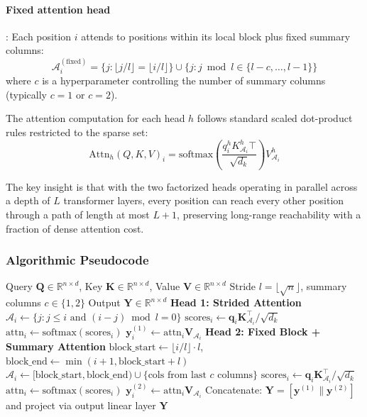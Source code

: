 \paragraph{Fixed attention head}: Each position $i$ attends to positions within its local block plus fixed summary columns:
\[
\mathcal{A}_i^{(\text{fixed})} = \{j : \lfloor j/l \rfloor = \lfloor i/l \rfloor\} \cup \{j : j \bmod l \in \{l-c, \ldots, l-1\}\}
\]
where $c$ is a hyperparameter controlling the number of summary columns (typically $c=1$ or $c=2$).

The attention computation for each head $h$ follows standard scaled dot-product rules restricted to the sparse set:
\[
\text{Attn}_h(Q, K, V)_i = \text{softmax}\left(\frac{q_i^h K_{\mathcal{A}_i}^h\top}{\sqrt{d_k}}\right) V_{\mathcal{A}_i}^h
\]

The key insight is that with the two factorized heads operating in parallel across a depth of $L$ transformer layers, every position can reach every other position through a path of length at most $L + 1$, preserving long-range reachability with a fraction of dense attention cost.

\subsubsection{Algorithmic Pseudocode}

\begin{algorithm}[H]
\caption{Sparse Transformer Attention: Strided + Fixed Dual Heads}
\begin{algorithmic}[1]
\Require Query $\mathbf{Q} \in \mathbb{R}^{n \times d}$, Key $\mathbf{K} \in \mathbb{R}^{n \times d}$, Value $\mathbf{V} \in \mathbb{R}^{n \times d}$
\Require Stride $l = \lfloor\sqrt{n}\rfloor$, summary columns $c \in \{1, 2\}$
\Ensure Output $\mathbf{Y} \in \mathbb{R}^{n \times d}$
\State \textbf{Head 1: Strided Attention}
    \State $\mathcal{A}_i \gets \{j : j \leq i \text{ and } (i-j) \bmod l = 0\}$ 
    \State $\text{scores}_{i} \gets \mathbf{q}_i \mathbf{K}_{\mathcal{A}_i}^\top / \sqrt{d_k}$
    \State $\text{attn}_{i} \gets \text{softmax}(\text{scores}_{i})$
    \State $\mathbf{y}_i^{(1)} \gets \text{attn}_{i} \mathbf{V}_{\mathcal{A}_i}$
\EndFor
\State \textbf{Head 2: Fixed Block + Summary Attention}
    \State $\text{block\_start} \gets \lfloor i/l \rfloor \cdot l$, $\text{block\_end} \gets \min(i+1, \text{block\_start}+l)$
    \State $\mathcal{A}_i \gets [\text{block\_start}, \text{block\_end}) \cup \{\text{cols from last } c \text{ columns}\}$
    \State $\text{scores}_{i} \gets \mathbf{q}_i \mathbf{K}_{\mathcal{A}_i}^\top / \sqrt{d_k}$
    \State $\text{attn}_{i} \gets \text{softmax}(\text{scores}_{i})$
    \State $\mathbf{y}_i^{(2)} \gets \text{attn}_{i} \mathbf{V}_{\mathcal{A}_i}$
\EndFor
\State Concatenate: $\mathbf{Y} = [\mathbf{y}^{(1)} \| \mathbf{y}^{(2)}]$ and project via output linear layer
\Return $\mathbf{Y}$
\end{algorithmic}
\end{algorithm}

